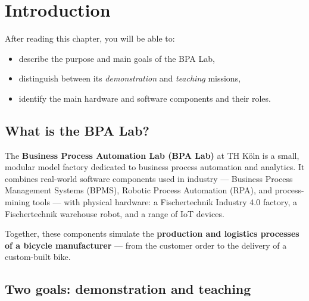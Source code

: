 \documentclass[
  english,
  11pt,
  a4paper,
]{scrbook}
\providecommand{\tightlist}{%
  \setlength{\itemsep}{0pt}\setlength{\parskip}{0pt}}
\begin{document}

\chapter{Introduction}\label{introduction}

\begin{tcolorbox}[enhanced jigsaw, arc=.35mm, bottomrule=.15mm, bottomtitle=1mm, breakable, colback=white, colbacktitle=quarto-callout-note-color!10!white, colframe=quarto-callout-note-color-frame, coltitle=black, left=2mm, leftrule=.75mm, opacityback=0, opacitybacktitle=0.6, rightrule=.15mm, title=\textcolor{quarto-callout-note-color}{\faInfo}\hspace{0.5em}{Learning objectives}, titlerule=0mm, toprule=.15mm, toptitle=1mm]

After reading this chapter, you will be able to:

\begin{itemize}
\tightlist
\item
  describe the purpose and main goals of the BPA Lab,
\item
  distinguish between its \emph{demonstration} and \emph{teaching}
  missions,
\item
  identify the main hardware and software components and their roles.
\end{itemize}

\end{tcolorbox}

\section{What is the BPA Lab?}\label{what-is-the-bpa-lab}

The \textbf{Business Process Automation Lab (BPA Lab)} at TH Köln is a
small, modular model factory dedicated to business process automation
and analytics. It combines real-world software components used in
industry --- Business Process Management Systems (BPMS), Robotic Process
Automation (RPA), and process-mining tools --- with physical hardware: a
Fischertechnik Industry 4.0 factory, a Fischertechnik warehouse robot,
and a range of IoT devices.

Together, these components simulate the \textbf{production and logistics
processes of a bicycle manufacturer} --- from the customer order to the
delivery of a custom-built bike.

\section{Two goals: demonstration and
teaching}\label{two-goals-demonstration-and-teaching}
\end{document}
